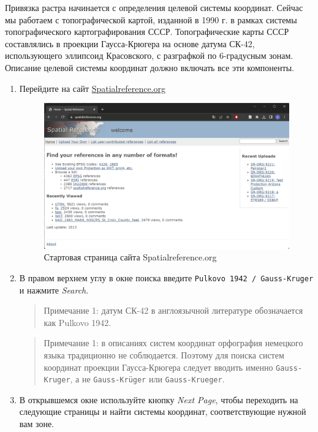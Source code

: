 \documentclass[
  12pt,
]{book}
\begin{document}
Привязка растра начинается с определения целевой системы координат. Сейчас мы работаем с топографической картой, изданной в 1990 г. в рамках системы топографического картографирования СССР. Топографические карты СССР составлялись в проекции Гаусса-Крюгера на основе датума СК-42, использующего эллипсоид Красовского, с разграфкой по 6-градусным зонам. Описание целевой системы координат должно включать все эти компоненты.

\begin{enumerate}
\def\labelenumi{\arabic{enumi}.}
\item
  Перейдите на сайт \href{https://spatialreference.org/}{Spatialreference.org}

  \begin{figure}
  \centering
  \includegraphics{images/Ex05_Reference/spatialreference0.png}
  \caption{Стартовая страница сайта Spatialreference.org}
  \end{figure}
\item
  В правом верхнем углу в окне поиска введите \texttt{Pulkovo\ 1942\ /\ Gauss-Kruger} и нажмите \emph{Search}.

  \begin{quote}
  Примечание 1: датум СК-42 в англоязычной литературе обозначается как Pulkovo 1942.
  \end{quote}

  \begin{quote}
  Примечание 1: в описаниях систем координат орфография немецкого языка традиционно не соблюдается. Поэтому для поиска систем координат проекции Гаусса-Крюгера следует вводить именно \texttt{Gauss-Kruger}, а не \texttt{Gauss-Krüger} или \texttt{Gauss-Krueger}.
  \end{quote}
\item
  В открывшемся окне используйте кнопку \emph{Next Page}, чтобы переходить на следующие страницы и найти системы координат, соответствующие нужной вам зоне.


\end{enumerate}
\end{document}
